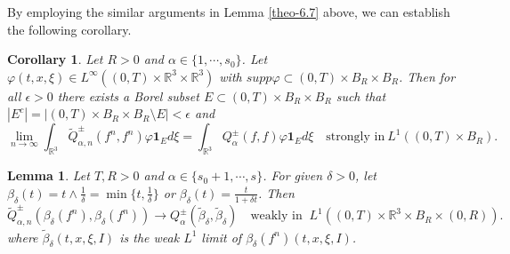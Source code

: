 \documentclass[reqno,11pt]{amsart}
\newtheorem{corollary}{Corollary}[section]
\newtheorem{lemma}{Lemma}[section]
\numberwithin{equation}{section}
\def\R{\mathbb{R}}
\begin{document}
By employing the similar arguments in Lemma \ref{theo-6.7} above, we can establish the following corollary.

\begin{corollary}\label{cor6.8}
	Let $R>0$ and $\alpha \in \{1,\cdots ,s_0\}$. Let $\varphi   (t, x, \xi) \in L^\infty ((0,T)\times \R^3 \times \R^3 )$ with $ supp \varphi \subset (0,T)\times B_R \times B_R$. Then for all $\epsilon>0$ there exists a Borel subset $E \subset(0,T)\times B_R \times B_R$ such that $|E^c| = | (0,T)\times B_R \times B_R \setminus E | <\epsilon$ and
	\begin{equation*}
		\lim \limits_{n\rightarrow \infty } \int_{\R^3} \tilde{Q}^\pm_{\alpha ,n} (f^n,f^n) \varphi \mathbf{1}_E d\xi  =  \int_{\R^3} Q^\pm_{\alpha } (f,f) \varphi \mathbf{1}_E d\xi \quad \text{strongly in} \ L^1 ((0,T)\times B_R).
	\end{equation*}
\end{corollary}


\begin{lemma}\label{theo-6.9}
Let $T, R > 0$ and $\alpha \in \{s_0+1,\cdots,s\}$. For given $\delta >0$, let $\beta_\delta (t)=t\wedge \frac{1}{\delta} = \min \{ t, \frac{1}{\delta} \} $ or $\beta_\delta (t)=\frac{t}{1+\delta t}$. Then
	\begin{equation*}
		\tilde{Q}^\pm_{\alpha ,n} (\beta_\delta(f^n),\beta_\delta (f^n)) \to Q^\pm _\alpha (\tilde{\beta }_\delta,\tilde{\beta }_\delta) \quad \text{weakly in }\ L^1((0,T)\times \R^3 \times B_R\times (0,R)).
	\end{equation*}
	where $\tilde{\beta}_\delta (t, x, \xi, I)$ is the weak $L^1$ limit of $\beta_\delta(f^n) (t, x, \xi, I)$.
\end{lemma}
\end{document}

